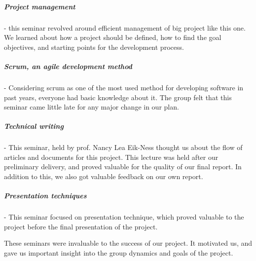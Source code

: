   \subparagraph{Project management} - this seminar revolved around efficient
  management of big project like this one. We learned about how a project should
  be defined, how to find the goal objectives, and starting points for the
  development process.

   \subparagraph{Scrum, an agile development method} - Considering scrum as one
   of the most used method for developing software in past years, everyone had
   basic knowledge about it.  The group felt that this seminar came little late
   for any major change in our plan.

  \subparagraph{Technical writing} - This seminar, held by prof. Nancy Lea
  Eik-Ness thought us about the flow of articles and documents for this project.
  This lecture was held after our preliminary delivery, and proved valuable for
  the quality of our final report. In addition to this, we also got valuable
  feedback on our own report.

  \subparagraph{Presentation techniques} - This seminar focused on presentation
  technique, which proved valuable to the project before the final presentation
  of the project.

  These seminars were invaluable to the success of our project. It motivated us,
  and gave us important insight into the group dynamics and goals of the
  project.

